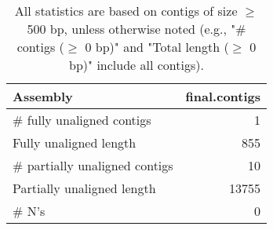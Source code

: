 \documentclass[12pt,a4paper]{article}
\begin{document}
\begin{table}[ht]
\begin{center}
\caption{All statistics are based on contigs of size $\geq$ 500 bp, unless otherwise noted (e.g., "\# contigs ($\geq$ 0 bp)" and "Total length ($\geq$ 0 bp)" include all contigs).}
\begin{tabular}{|l*{1}{|r}|}
\hline
Assembly & final.contigs \\ \hline
\# fully unaligned contigs & 1 \\ \hline
Fully unaligned length & 855 \\ \hline
\# partially unaligned contigs & 10 \\ \hline
Partially unaligned length & 13755 \\ \hline
\# N's & 0 \\ \hline
\end{tabular}
\end{center}
\end{table}
\end{document}
